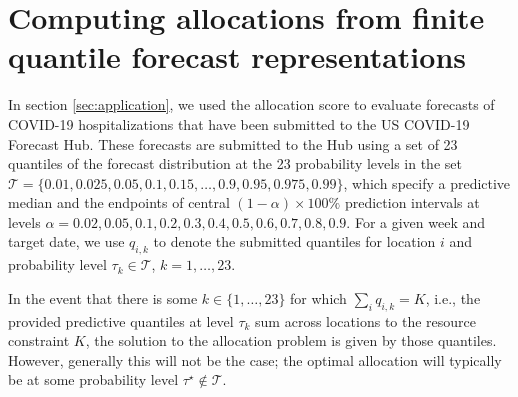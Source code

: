 \documentclass{article}\usepackage[]{graphicx}\usepackage[]{xcolor}
\begin{document}
\section{Computing allocations from finite quantile forecast representations}
\label{sec:a:distfromq}

In section \ref{sec:application}, we used the allocation score to evaluate forecasts of COVID-19
hospitalizations that have been submitted to the US COVID-19 Forecast Hub. These forecasts are submitted to the Hub
using a set of 23 quantiles of the forecast distribution at the 23 probability levels in the set $\mathcal{T} = \{0.01,
0.025, 0.05, 0.1, 0.15, \ldots, \allowbreak 0.9, 0.95, 0.975, 0.99\}$, which specify a predictive median and the
endpoints of central $(1 - \alpha) \times 100\%$ prediction intervals at levels $\alpha = 0.02, 0.05, 0.1, 0.2,
\allowbreak 0.3, 0.4, 0.5, 0.6, \allowbreak 0.7, 0.8, 0.9$. For a given week and target date, we use $q_{i,k}$ to denote
the submitted quantiles for location $i$ and probability level $\tau_k \in \mathcal{T}$, $k = 1, \ldots, 23$.

In the event that there is some $k \in \{1, \ldots, 23\}$ for which $\sum_i q_{i,k} = K$, i.e., the provided predictive
quantiles at level $\tau_k$ sum across locations to the resource constraint $K$, the solution to the allocation problem
is given by those quantiles. However, generally this will not be the case; the optimal allocation will typically be at
some probability level $\tau^\star \notin \mathcal{T}$.
\end{document}
